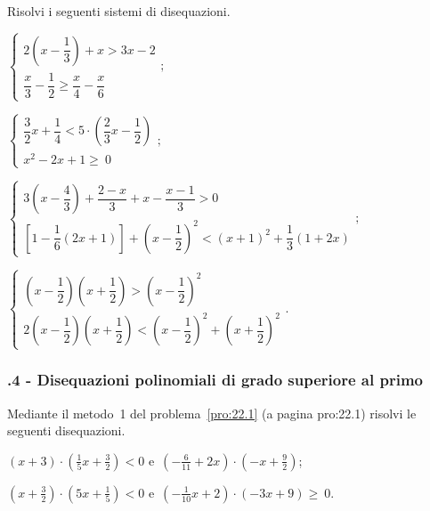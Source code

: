 \begin{esercizio}[\Ast]
 \label{ese:21.41}
 Risolvi i seguenti sistemi di disequazioni.

 \begin{enumeratea}
 \item {\longarray $\left\{\begin{array}{l}
	2\left(x-\dfrac{1}{3}\right)+x>3x-2\\
	\dfrac{x}{3}-\dfrac{1}{2}\ge \dfrac{x}{4}-\dfrac{x}{6}
   \end{array}\right.;$}
\item $\left\{\begin{array}{l}
    \dfrac{3}{2}x+\dfrac{1}{4}<5\cdot\left(\dfrac{2}{3}x-\dfrac{1}{2}\right)\\
    x^2-2x+1\ge~0
   \end{array}\right.;$
\item {\longarray $\left\{\begin{array}{l}
	3\left(x-\dfrac{4}{3}\right)+\dfrac{2-x}{3}+x-\dfrac{x-1}{3}>0\\
	\left[1-\dfrac{1}{6}(2x+1)\right]+\left(x-\dfrac{1}{2}\right)^{2}<(x+1)^{2}+\dfrac{1}{3}(1+2x)
   \end{array}\right.;$}
\item {\longarray $\left\{\begin{array}{l}
	\left(x-\dfrac{1}{2}\right)\left(x+\dfrac{1}{2}\right)>\left(x-\dfrac{1}{2}\right)^{2}\\
	2\left(x-\dfrac{1}{2}\right)\left(x+\dfrac{1}{2}\right)<\left(x-\dfrac{1}{2}\right)^{2}+\left(x+\dfrac{1}{2}\right)^{2}
   \end{array}\right..$}
 \end{enumeratea}
\end{esercizio}

\subsubsection*{\thechapter.4 - Disequazioni polinomiali di grado superiore al primo}
\begin{esercizio}
 \label{ese:21.42}
 Mediante il metodo~1 del problema~\ref{pro:22.1} (a pagina pro:22.1) risolvi le seguenti disequazioni.

\begin{enumeratea}
\item $(x+3)\cdot \left(\frac{1}{5}x+\frac{3}{2}\right)<0$ e~$\left(-{\frac{6}{11}}+2x\right)\cdot\left(-x+\frac{9}{2}\right)$;
\item $\left(x+\frac{3}{2}\right)\cdot \left(5x+\frac{1}{5}\right)<0$ e~$\left(-{\frac{1}{10}}x+2\right)\cdot \left(-3x+9\right)\ge~0$.
\end{enumeratea}

\end{esercizio}


